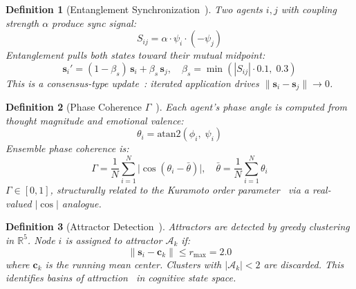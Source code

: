 \documentclass[conference]{IEEEtran}
\newtheorem{definition}{Definition}
\begin{document}
\begin{definition}[Entanglement Synchronization~\cite{harrison2026codettefull}]
\label{def:entangle}
Two agents $i, j$ with coupling strength $\alpha$ produce sync signal:
\begin{equation}
  S_{ij} = \alpha \cdot \psi_i \cdot (-\psi_j)
  \label{eq:entangle_signal}
\end{equation}
Entanglement pulls both states toward their mutual midpoint:
\begin{equation}
  \mathbf{s}_i' = (1 - \beta_s)\,\mathbf{s}_i + \beta_s\,\mathbf{s}_j, \quad \beta_s = \min(|S_{ij}| \cdot 0.1,\; 0.3)
  \label{eq:entangle_update}
\end{equation}
This is a consensus-type update~\cite{ren2005consensus}: iterated application drives $\|\mathbf{s}_i - \mathbf{s}_j\| \to 0$.
\end{definition}

\begin{definition}[Phase Coherence $\Gamma$~\cite{harrison2026codettefull}]
\label{def:coherence}
Each agent's phase angle is computed from thought magnitude and emotional valence:
\begin{equation}
  \theta_i = \text{atan2}(\phi_i,\; \psi_i)
  \label{eq:phase_angle}
\end{equation}
Ensemble phase coherence is:
\begin{equation}
  \Gamma = \frac{1}{N} \sum_{i=1}^{N} \bigl|\cos(\theta_i - \bar{\theta})\bigr|, \quad \bar{\theta} = \frac{1}{N} \sum_{i=1}^{N} \theta_i
  \label{eq:gamma}
\end{equation}
$\Gamma \in [0, 1]$, structurally related to the Kuramoto order parameter~\cite{kuramoto1984chemical,acebron2005kuramoto} via a real-valued $|\cos|$ analogue.
\end{definition}

\begin{definition}[Attractor Detection~\cite{harrison2026codettefull}]
\label{def:attractor}
Attractors are detected by greedy clustering in $\mathbb{R}^5$. Node $i$ is assigned to attractor $\mathcal{A}_k$ if:
\begin{equation}
  \|\mathbf{s}_i - \mathbf{c}_k\| \leq r_{\max} = 2.0
  \label{eq:attractor}
\end{equation}
where $\mathbf{c}_k$ is the running mean center. Clusters with $|\mathcal{A}_k| < 2$ are discarded. This identifies basins of attraction~\cite{strogatz2015nonlinear} in cognitive state space.
\end{definition}
\end{document}
